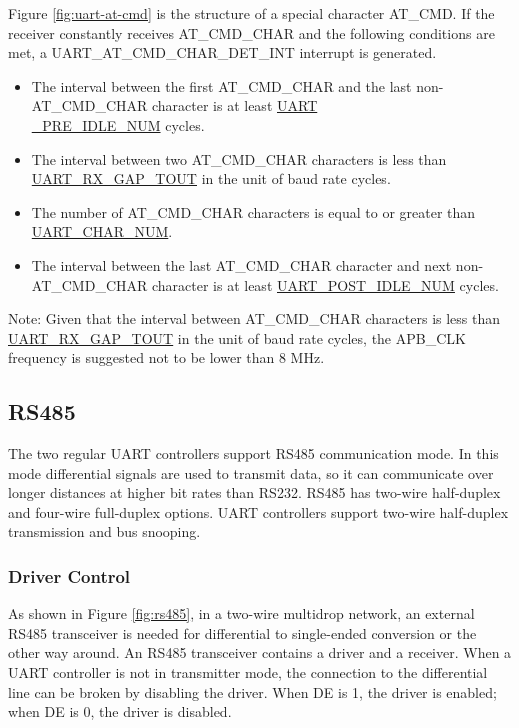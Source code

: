 \documentclass[main\_\_EN.tex]{subfiles}
\begin{document}
Figure \ref{fig:uart-at-cmd} is the structure of a special character AT\_CMD. If the receiver constantly receives AT\_CMD\_CHAR and the following conditions are met, a UART\_AT\_CMD\_CHAR\_DET\_INT interrupt is generated.

\begin{itemize}
    \item The interval between the first AT\_CMD\_CHAR and the last non-AT\_CMD\_CHAR character is at least \hyperref[fielddesc:UARTPREIDLENUM]{UART\\\_PRE\_IDLE\_NUM} cycles.
    \item The interval between two AT\_CMD\_CHAR characters is less than \hyperref[fielddesc:UARTRXGAPTOUT]{UART\_RX\_GAP\_TOUT} in the unit of baud rate cycles.
    \item The number of AT\_CMD\_CHAR characters is equal to or greater than \hyperref[fielddesc:UARTCHARNUM]{UART\_CHAR\_NUM}.
    \item The interval between the last AT\_CMD\_CHAR character and next non-AT\_CMD\_CHAR character is at least \hyperref[fielddesc:UARTPOSTIDLENUM]{UART\_POST\_IDLE\_NUM} cycles.
\end{itemize}

Note: Given that the interval between AT\_CMD\_CHAR characters is less than \hyperref[fielddesc:UARTRXGAPTOUT]{UART\_RX\_GAP\_TOUT} in the unit of baud rate cycles, the APB\_CLK frequency is suggested not to be lower than 8 MHz.

\subsection{RS485}

The two regular UART controllers support RS485 communication mode. In this mode differential signals are used to transmit data, so it can communicate over longer distances at higher bit rates than RS232. RS485 has two-wire half-duplex and four-wire full-duplex options. UART controllers support two-wire half-duplex transmission and bus snooping.


\subsubsection{Driver Control}

As shown in Figure \ref{fig:rs485}, in a two-wire multidrop network, an external RS485 transceiver is needed for differential to single-ended conversion or the other way around. An RS485 transceiver contains a driver and a receiver. When a UART controller is not in transmitter mode, the connection to the differential line can be broken by disabling the driver. When DE is 1, the driver is enabled; when DE is 0, the driver is disabled.
\end{document}
